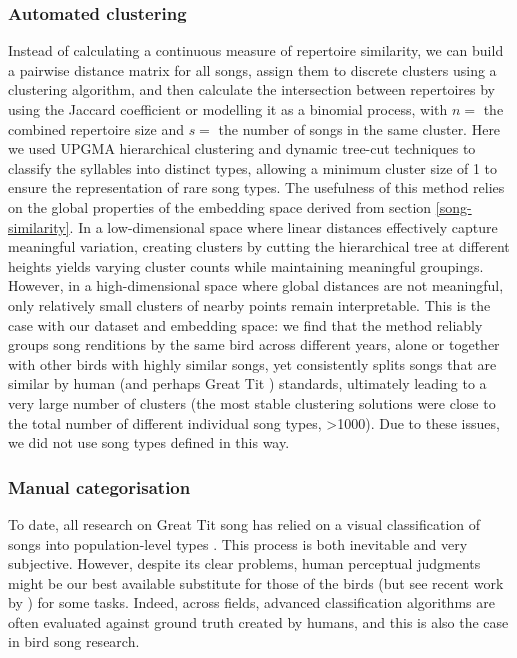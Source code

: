 \subsubsection{Automated clustering}

Instead of calculating a continuous measure of repertoire similarity, we can build a pairwise distance matrix for all songs, assign them to discrete clusters using a clustering algorithm, and then calculate the intersection between repertoires by using the Jaccard coefficient or modelling it as a binomial process, with $n = $ the combined repertoire size and $s = $ the number of songs in the same cluster. Here we used UPGMA hierarchical clustering and dynamic tree-cut techniques to classify the syllables into distinct types, allowing a minimum cluster size of 1 to ensure the representation of rare song types. The usefulness of this method relies on the global properties of the embedding space derived from section \ref{song-similarity}. In a low-dimensional space where linear distances effectively capture meaningful variation, creating clusters by cutting the hierarchical tree at different heights yields varying cluster counts while maintaining meaningful groupings. However, in a high-dimensional space where global distances are not meaningful, only relatively small clusters of nearby points remain interpretable. This is the case with our dataset and embedding space: we find that the method reliably groups song renditions by the same bird across different years, alone or together with other birds with highly similar songs, yet consistently splits songs that are similar by human (and perhaps Great Tit \parencite{falls1982}) standards, ultimately leading to a very large number of clusters (the most stable clustering solutions were close to the total number of different individual song types, >1000). Due to these issues, we did not use song types defined in this way.

\subsubsection{Manual categorisation}

To date, all research on Great Tit song has relied on a visual classification of songs into population-level types \parencite{baker1987, falls1982, fayet2014, hutfluss2022, mcgregor1982, mcgregor1981, mcgregor1982b}. This process is both inevitable and very subjective. However, despite its clear problems, human perceptual judgments might be our best available substitute for those of the birds (but see recent work by \cite{morfi2021, zandberg2022}) for some tasks. Indeed, across fields, advanced classification algorithms are often evaluated against ground truth created by humans, and this is also the case in bird song research.


